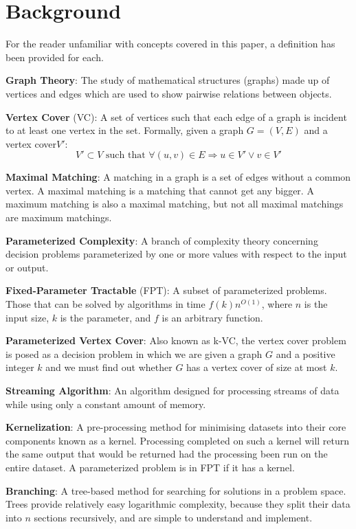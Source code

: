\section{Background}

For the reader unfamiliar with concepts covered in this paper, a definition has
been provided for each.

\textbf{Graph Theory}: The study of mathematical structures (graphs) made up of
vertices and edges which are used to show pairwise relations between objects.

\textbf{Vertex Cover} (VC): A set of vertices such that each edge of a graph is
incident to at least one vertex in the set. Formally, given a graph \(G = (V,
E)\) and a vertex cover\(V'\):
\[
    V' \subset V \text{ such that } \forall (u, v) \in E \Rightarrow u \in V' \vee v \in V'
\]

\textbf{Maximal Matching}: A matching in a graph is a set of edges without a
common vertex. A maximal matching is a matching that cannot get any bigger. A
maximum matching is also a maximal matching, but not all maximal matchings are
maximum matchings.

\textbf{Parameterized Complexity}: A branch of complexity theory concerning
decision problems parameterized by one or more values with respect to the input
or output.

\textbf{Fixed-Parameter Tractable} (FPT): A subset of parameterized problems.
Those that can be solved by algorithms in time \(f(k)n^{O(1)}\), where \(n\) is
the input size, \(k\) is the parameter, and \(f\) is an arbitrary function.

\textbf{Parameterized Vertex Cover}: Also known as k-VC, the vertex cover
problem is posed as a decision problem in which we are given a graph \(G\) and
a positive integer \(k\) and we must find out whether \(G\) has a vertex cover
of size at most \(k\).

\textbf{Streaming Algorithm}: An algorithm designed for processing streams of
data while using only a constant amount of memory.

\textbf{Kernelization}: A pre-processing method for minimising datasets into
their core components known as a kernel. Processing completed on such a kernel
will return the same output that would be returned had the processing been run
on the entire dataset. A parameterized problem is in FPT if it has a kernel.

\textbf{Branching}: A tree-based method for searching for solutions in a
problem space. Trees provide relatively easy logarithmic complexity, because
they split their data into \(n\) sections recursively, and are simple to
understand and implement.
